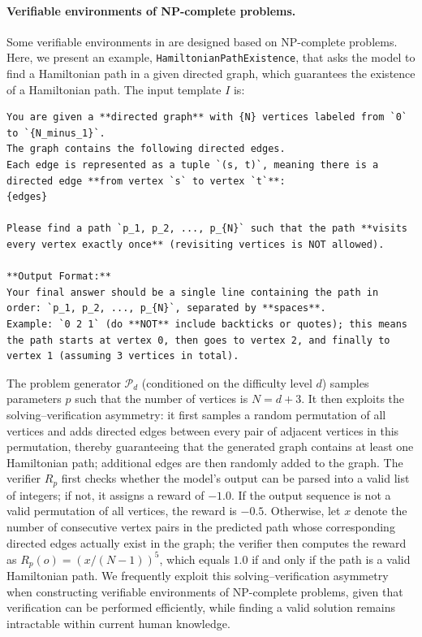 \documentclass{article}
\theoremstyle{plain}
\theoremstyle{definition}
\theoremstyle{remark}
\begin{document}
\paragraph{Verifiable environments of NP-complete problems.}
Some verifiable environments in \suite{} are designed based on NP-complete problems.
Here, we present an example, \texttt{HamiltonianPathExistence}, that asks the model to find a Hamiltonian path in a given directed graph, which guarantees the existence of a Hamiltonian path.
The input template $I$ is:
\begin{lstlisting}[language={},caption={},label={}]
You are given a **directed graph** with {N} vertices labeled from `0` to `{N_minus_1}`.
The graph contains the following directed edges.
Each edge is represented as a tuple `(s, t)`, meaning there is a directed edge **from vertex `s` to vertex `t`**:
{edges}

Please find a path `p_1, p_2, ..., p_{N}` such that the path **visits every vertex exactly once** (revisiting vertices is NOT allowed).

**Output Format:**
Your final answer should be a single line containing the path in order: `p_1, p_2, ..., p_{N}`, separated by **spaces**.
Example: `0 2 1` (do **NOT** include backticks or quotes); this means the path starts at vertex 0, then goes to vertex 2, and finally to vertex 1 (assuming 3 vertices in total).
\end{lstlisting}

The problem generator $\mathcal{P}_{d}$ (conditioned on the difficulty level $d$) samples parameters $p$ such that the number of vertices is $N = d + 3$.
It then exploits the solving–verification asymmetry: 
it first samples a random permutation of all vertices and adds directed edges between every pair of adjacent vertices in this permutation, thereby guaranteeing that the generated graph contains at least one Hamiltonian path;
additional edges are then randomly added to the graph.
The verifier $R_{p}$ first checks whether the model’s output can be parsed into a valid list of integers; if not, it assigns a reward of $-1.0$.
If the output sequence is not a valid permutation of all vertices, the reward is $-0.5$.
Otherwise, let $x$ denote the number of consecutive vertex pairs in the predicted path whose corresponding directed edges actually exist in the graph;
the verifier then computes the reward as $R_{p}(o) = (x / (N - 1))^{5}$, which equals $1.0$ if and only if the path is a valid Hamiltonian path.
We frequently exploit this solving–verification asymmetry when constructing verifiable environments of NP-complete problems, given that verification can be performed efficiently, while finding a valid solution remains intractable within current human knowledge.
\end{document}
